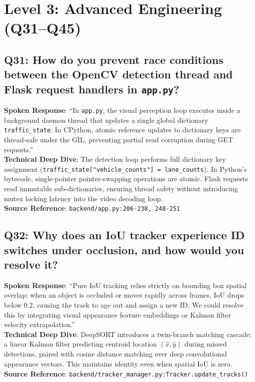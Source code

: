 \documentclass[11pt,a4paper,oneside]{report}
\begin{document}
\section{Level 3: Advanced Engineering (Q31--Q45)}

\subsection*{Q31: How do you prevent race conditions between the OpenCV detection thread and Flask request handlers in \texttt{app.py}?}
\begin{interviewbox}
\textbf{Spoken Response}: ``In \texttt{app.py}, the visual perception loop executes inside a background daemon thread that updates a single global dictionary \texttt{traffic\_state}. In CPython, atomic reference updates to dictionary keys are thread-safe under the GIL, preventing partial read corruption during GET requests.''\\
\textbf{Technical Deep Dive}: The detection loop performs full dictionary key assignment (\texttt{traffic\_state["vehicle\_counts"] = lane\_counts}). In Python's bytecode, single-pointer pointer-swapping operations are atomic. Flask requests read immutable sub-dictionaries, ensuring thread safety without introducing mutex locking latency into the video decoding loop.\\
\textbf{Source Reference}: \texttt{backend/app.py:206-238, 248-251}
\end{interviewbox}

\subsection*{Q32: Why does an IoU tracker experience ID switches under occlusion, and how would you resolve it?}
\begin{interviewbox}
\textbf{Spoken Response}: ``Pure IoU tracking relies strictly on bounding box spatial overlap; when an object is occluded or moves rapidly across frames, IoU drops below 0.2, causing the track to age out and assign a new ID. We could resolve this by integrating visual appearance feature embeddings or Kalman filter velocity extrapolation.''\\
\textbf{Technical Deep Dive}: DeepSORT introduces a twin-branch matching cascade: a linear Kalman filter predicting centroid location $(\hat{x}, \hat{y})$ during missed detections, paired with cosine distance matching over deep convolutional appearance vectors. This maintains identity even when spatial IoU is zero.\\
\textbf{Source Reference}: \texttt{backend/tracker\_manager.py:Tracker.update\_tracks()}
\end{interviewbox}
\end{document}
